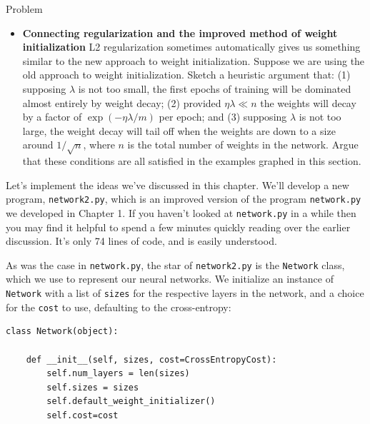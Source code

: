 \begin{exerciseBox}{Problem}


\begin{itemize}

\item \textbf{Connecting regularization and the improved method of weight initialization} L2 regularization sometimes automatically gives us something similar to the new approach to weight initialization. Suppose we are using the old approach to weight initialization. Sketch a heuristic argument that: (1) supposing $\lambda$ is not too small, the first epochs of training will be dominated almost entirely by weight decay; (2) provided $\eta \lambda \ll n$ the weights will decay by a factor of $\exp(-\eta \lambda / m)$ per epoch; and (3) supposing $\lambda$ is not too large, the weight decay will tail off when the weights are down to a size around $1/\sqrt{n}$, where $n$ is the total number of weights in the network. Argue that these conditions are all satisfied in the examples graphed in this section.

\end{itemize}

\end{exerciseBox}





Let's implement the ideas we've discussed in this chapter. We'll develop a new program, \texttt{network2.py}, which is an improved version of the program \texttt{network.py} we developed in Chapter 1. If you haven't looked at \texttt{network.py} in a while then you may find it helpful to spend a few minutes quickly reading over the earlier discussion. It's only 74 lines of code, and is easily understood.


As was the case in \texttt{network.py}, the star of \texttt{network2.py} is the \texttt{Network} class, which we use to represent our neural networks. We initialize an instance of \texttt{Network} with a list of \texttt{sizes} for the respective layers in the network, and a choice for the \texttt{cost} to use, defaulting to the cross-entropy:



\begin{lstlisting}
class Network(object):

    def __init__(self, sizes, cost=CrossEntropyCost):
        self.num_layers = len(sizes)
        self.sizes = sizes
        self.default_weight_initializer()
        self.cost=cost

\end{lstlisting}


